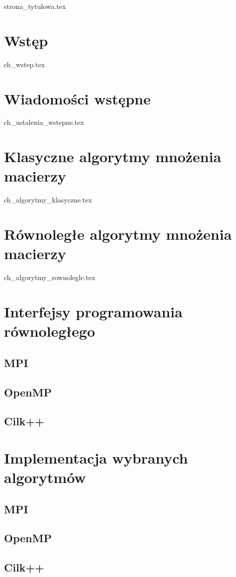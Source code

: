 \documentclass[a4paper,oneside,leqno,12pt]{book}
\begin{document}
{strona_tytulowa.tex}
\tableofcontents

\chapter{Wstęp}
{ch_wstep.tex}
\chapter{Wiadomości wstępne}
{ch_ustalenia_wstepne.tex}
\chapter{Klasyczne algorytmy mnożenia macierzy}
{ch_algorytmy_klasyczne.tex}
\chapter{Równoległe algorytmy mnożenia macierzy}
{ch_algorytmy_rownolegle.tex}

\chapter{Interfejsy programowania równoległego}
\section{MPI}
\section{OpenMP}
\section{Cilk++}

\chapter{Implementacja wybranych algorytmów}
\section{MPI}
\section{OpenMP}
\section{Cilk++}



\end{document}
